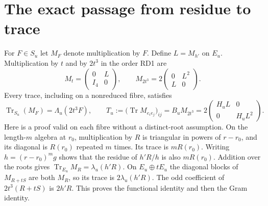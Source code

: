 \documentclass[11pt]{article}
\begin{document}
\section{The exact passage from residue to trace}
For $F\in S_u$ let $M_F$ denote multiplication by $F$.
Define $L=M_{h'}$ on $E_u$. Multiplication by $t$ and by
$2t^3$ in the order RD1 are
\begin{equation}
 M_t=\begin{pmatrix}0&L\\I_4&0\end{pmatrix},\qquad
 M_{2t^3}=2\begin{pmatrix}0&L^2\\L&0\end{pmatrix}.
 \tag{RD5}
\end{equation}
Every trace, including on a nonreduced fibre, satisfies
\begin{equation}
 \operatorname{Tr}_{S_u}(M_F)=\Lambda_u(2t^3F),\qquad
 T_u:=\bigl(\operatorname{Tr}M_{e_i e_j}\bigr)_{ij}
    =B_uM_{2t^3}
    =2\begin{pmatrix}H_uL&0\\0&H_uL^2\end{pmatrix}.
 \tag{RD6}
\end{equation}
Here is a proof valid on each fibre without a distinct-root
assumption. On the length-$m$ algebra at $r_0$, multiplication
by $R$ is triangular in powers of $r-r_0$, and its diagonal
is $R(r_0)$ repeated $m$ times. Its trace is $mR(r_0)$.
Writing $h=(r-r_0)^m g$ shows that the residue of $h'R/h$
is also $mR(r_0)$. Addition over the roots gives
$\operatorname{Tr}_{E_u}M_R=\lambda_u(h'R)$.
On $E_u\oplus tE_u$ the diagonal blocks of $M_{R+tS}$
are both $M_R$, so its trace is $2\lambda_u(h'R)$.
The odd coefficient of $2t^3(R+tS)$ is $2h'R$.
This proves the functional identity and then the Gram identity.
\end{document}
